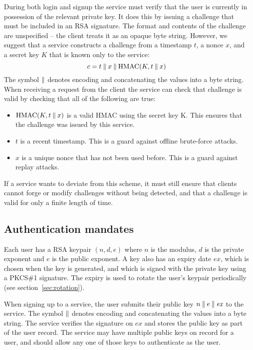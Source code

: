 During both login and signup the service must verify that the user is currently in possession of the
relevant private key. It does this by issuing a challenge that must be included in an RSA signature.
The format and contents of the challenge are unspecified -- the client treats it as an opaque byte
string. However, we suggest that a service constructs a challenge from a timestamp $t$, a nonce $x$,
and a secret key $K$ that is known only to the service:
$$c = t \mathbin{\|} x \mathbin{\|} \mathrm{HMAC}(K, t \mathbin{\|} x)$$
The symbol $\mathbin{\|}$ denotes encoding and concatenating the values into a byte string. When receiving
a request from the client the service can check that challenge is valid by checking that all of the
following are true:
\begin{itemize}
\item $\mathrm{HMAC}(K, t \mathbin{\|} x)$ is a valid HMAC using the secret key K. This ensures that the
challenge was issued by this service.
\item $t$ is a recent timestamp. This is a guard against offline brute-force attacks.
\item $x$ is a unique nonce that has not been used before. This is a guard against replay attacks.
\end{itemize}

If a service wants to deviate from this scheme, it must still ensure that clients cannot forge or
modify challenges without being detected, and that a challenge is valid for only a finite length
of time.

\subsection{Authentication mandates}\label{sec:mandates}

Each user has a RSA keypair $(n, d, e)$ where $n$ is the modulus, $d$ is the private exponent and
$e$ is the public exponent. A key also has an expiry date $\mathit{ex}$, which is chosen when the
key is generated, and which is signed with the private key using a PKCS\#1 signature. The expiry is
used to rotate the user's keypair periodically (see section~\ref{sec:rotation}).

When signing up to a service, the user submits their public key $n \mathbin{\|} e \mathbin{\|} \mathit{ex}$ to
the service. The symbol $\mathbin{\|}$ denotes encoding and concatenating the values into a byte string.
The service verifies the signature on $\mathit{ex}$ and stores the public key as part of the user
record. The service may have multiple public keys on record for a user, and should allow any one of
those keys to authenticate as the user.

